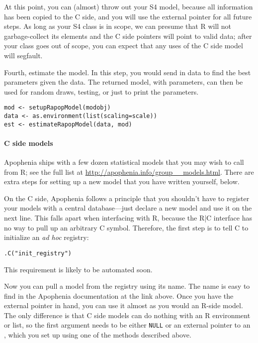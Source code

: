 \documentclass{article}
\begin{document}
At this point, you can (almost) throw out your S4 model, because all information has been
copied to the C side, and you will use the external pointer for all future steps. As long
as your S4 class is in scope, we can presume that R will not garbage-collect its elements
and the C side pointers will point to valid data; after your class goes out of scope,
you can expect that any uses of the C side model will segfault.

Fourth, estimate the model. In this step, you would send in data to find the best
parameters given the data. The returned model, with parameters, can then be used for
random draws, testing, or just to print the parameters.



\begin{verbatim}
mod <- setupRapopModel(modobj)
data <- as.environment(list(scaling=scale))
est <- estimateRapopModel(data, mod)
\end{verbatim}


\paragraph{C side models} Apophenia ships with a few dozen statistical models that you may
wish to call from R; see the full list at \url{http://apophenia.info/group__models.html}.
There are extra steps for setting up a new model that you have written yourself, below.

On the C side, Apophenia follows a principle that you shouldn't have to register your
models with a central database---just declare a new model and use it on the next line.
This falls apart when interfacing with R, because the R|C interface has no way to pull
up an arbitrary C symbol. Therefore, the first step is to tell C to initialize an {\em
ad hoc} registry:

\begin{verbatim}
.C("init_registry")
\end{verbatim}

This requirement is likely to be automated soon.

Now you can pull a model from the registry using its name. The name is easy to find in the
Apophenia documentation at the link above. Once you have the external pointer in hand, you
can use it almost as you would an R-side model. The only difference is that C side models
can do nothing with an R environment or list, so the first argument needs to be either
{\tt NULL} or an external pointer to an \ad, which you set up using one of the methods
described above.
\end{document}

